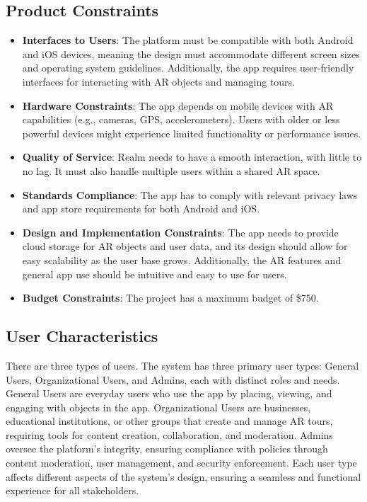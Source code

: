 \documentclass{article}
\begin{document}
\subsection{Product Constraints}

\begin{itemize}
    \item \textbf{Interfaces to Users}: The platform must be compatible with both Android and iOS devices, meaning the design must accommodate different screen sizes and operating system guidelines. Additionally, the app requires user-friendly interfaces for interacting with AR objects and managing tours.

    \item \textbf{Hardware Constraints}: The app depends on mobile devices with AR capabilities (e.g., cameras, GPS, accelerometers). Users with older or less powerful devices might experience limited functionality or performance issues.

    \item \textbf{Quality of Service}: Realm needs to have a smooth interaction, with little to no lag. It must also handle multiple users within a shared AR space.

    \item \textbf{Standards Compliance}: The app has to comply with relevant privacy laws and app store requirements for both Android and iOS.

    \item \textbf{Design and Implementation Constraints}: The app needs to provide cloud storage for AR objects and user data, and its design should allow for easy scalability as the user base grows. Additionally, the AR features and general app use should be intuitive and easy to use for users.

    \item \textbf{Budget Constraints}: The project has a maximum budget of \$750.
\end{itemize}

\subsection{User Characteristics}

There are three types of users. The system has three primary user types: General Users, Organizational Users, and Admins, each with distinct roles and needs. General Users are everyday users who use the app by placing, viewing, and engaging with objects in the app. Organizational Users are businesses, educational institutions, or other groups that create and manage AR tours, requiring tools for content creation, collaboration, and moderation. Admins oversee the platform’s integrity, ensuring compliance with policies through content moderation, user management, and security enforcement. Each user type affects different aspects of the system’s design, ensuring a seamless and functional experience for all stakeholders.\\
\end{document}
